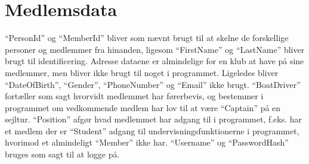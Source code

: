 \section{Medlemsdata}

``PersonId'' og ``MemberId'' bliver som nævnt brugt til at skelne de forskellige personer og medlemmer fra hinanden,
ligesom ``FirstName'' og ``LastName'' bliver brugt til identificering. Adresse dataene er almindelige for en klub at
have på sine medlemmer, men bliver ikke brugt til noget i programmet. Ligeledes bliver ``DateOfBirth'', ``Gender'',
``PhoneNumber'' og ``Email'' ikke brugt. ``BoatDriver'' fortæller som sagt hvorvidt medlemmet har førerbevis, og
bestemmer i programmet om vedkommende medlem har lov til at være ``Captain'' på en sejltur. ``Position'' afgør hvad
medlemmet har adgang til i programmet, f.eks. har et medlem der er ``Student'' adgang til undervisningsfunktionerne i
programmet, hvorimod et almindeligt ``Member'' ikke har. ``Username'' og ``PasswordHash'' bruges som sagt til at logge
på.
